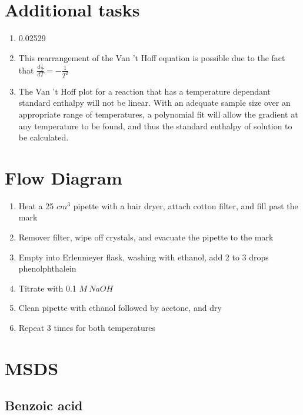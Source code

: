\documentclass[a4paper, british]{article}
\begin{document}
\begin{appendices}

\section{Additional tasks}

\begin{enumerate}
    \item 0.02529
    \item This rearrangement of the Van 't Hoff equation is possible due to the fact that \(\frac{d\frac{1}{T}}{dT} = -\frac{1}{T^2}\)
    \item  The Van 't Hoff plot for a reaction that has a temperature dependant standard enthalpy will not be linear. With an adequate sample size over an appropriate range of temperatures, a polynomial fit will allow the gradient at any temperature to be found, and thus the standard enthalpy of solution to be calculated.
\end{enumerate}

\newpage

\section{Flow Diagram}

\begin{enumerate}
    \item Heat a  25 \(cm^3\) pipette with a hair dryer, attach cotton filter, and fill past the mark
    \item Remover filter, wipe off crystals, and evacuate the pipette to the mark
    \item Empty into Erlenmeyer flask, washing with ethanol, add 2 to 3 drops phenolphthalein 
    \item Titrate with 0.1 \(M\ NaOH\)
    \item Clean pipette with ethanol followed by acetone, and dry
    \item Repeat 3 times for both temperatures
\end{enumerate}

\newpage

\section{MSDS}

\subsection*{Benzoic acid}


\end{appendices}
\end{document}
